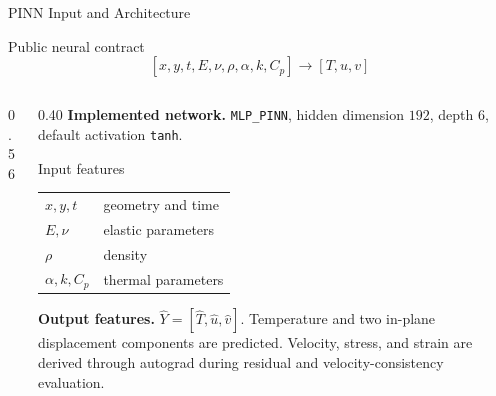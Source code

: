 \documentclass[aspectratio=169,10pt]{beamer}
\begin{document}
\begin{frame}[shrink=5]{PINN Input and Architecture}
  \begin{block}{Public neural contract}
    \[
      [x,y,t,E,\nu,\rho,\alpha,k,C_p]\rightarrow[T,u,v]
    \]
  \end{block}
  \begin{columns}[T]
    \begin{column}{0.56\textwidth}
      \centering
    \end{column}
    \begin{column}{0.40\textwidth}
      {\scriptsize\textbf{Implemented network.} \texttt{MLP\_PINN},
      hidden dimension $192$, depth $6$, default activation \texttt{tanh}.}
      \begin{block}{Input features}
        \scriptsize
        \begin{tabular}{@{}ll@{}}
          $x,y,t$ & geometry and time\\
          $E,\nu$ & elastic parameters\\
          $\rho$ & density\\
          $\alpha,k,C_p$ & thermal parameters
        \end{tabular}
      \end{block}
      {\scriptsize\textbf{Output features.}
      $\hat{Y}=[\hat{T},\hat{u},\hat{v}]$.
      Temperature and two in-plane displacement components are predicted.
      Velocity, stress, and strain are derived through autograd during residual
      and velocity-consistency evaluation.}
    \end{column}
  \end{columns}
\end{frame}
\end{document}
